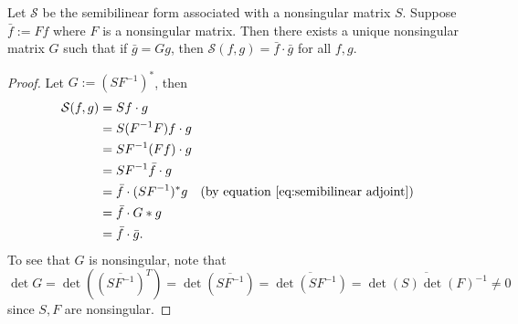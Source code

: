 \documentclass[11pt, oneside, a4paper]{article}
\begin{document}
\begin{prop}\cite[p.287]{CoddingtonLevinson}\label{prop:unique nonsingular G in semibilinear form}
    Let $\mathcal{S}$ be the semibilinear form associated with a nonsingular matrix $S$. Suppose $\bar{f}:=Ff$ where $F$ is a nonsingular matrix. Then there exists a unique nonsingular matrix $G$ such that if $\bar{g}=Gg$, then $\mathcal{S}(f,g)=\bar{f}\cdot \bar{g}$ for all $f, g$.
\end{prop}
\begin{proof}
    Let $G:=(SF^{-1})^*$, then
    \begin{align*}
        \mathcal{S}(f,g) &= Sf\cdot g\\
        &= S(F^{-1}F)f\cdot g\\
        &= SF^{-1}(Ff)\cdot g\\
        &= SF^{-1}\bar{f} \cdot g\\
        &= \bar{f}\cdot (SF^{-1})^*g \quad\mbox{(by equation \eqref{eq:semibilinear adjoint})}\\
        &= \bar{f}\cdot G*g\\
        &= \bar{f}\cdot \bar{g}.
    \end{align*}
    To see that $G$ is nonsingular, note that $\det G = \det((\overline{SF^{-1}})^T) = \det(\overline{SF^{-1}}) = \overline{\det(SF^{-1})} = \overline{\det(S)\det(F)^{-1}}\neq 0$ since $S, F$ are nonsingular.
\end{proof}
\end{document}
